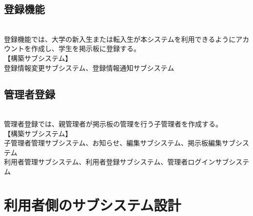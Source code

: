 \documentclass[a4j]{jarticle}
\begin{document}
\subsection{登録機能}
\\登録機能では、大学の新入生または転入生が本システムを利用できるようにアカウントを作成し、学生を掲示板に登録する。
\\【構築サブシステム】
\\ 登録情報変更サブシステム、登録情報通知サブシステム

\subsection{管理者登録}
\\管理者登録では、親管理者が掲示板の管理を行う子管理者を作成する。
\\【構築サブシステム】
\\ 子管理者管理サブシステム、お知らせ、編集サブシステム、掲示板編集サブシステム
\\ 利用者管理サブシステム、利用者登録サブシステム、管理者ログインサブシステム

\section{利用者側のサブシステム設計}
\end{document}
